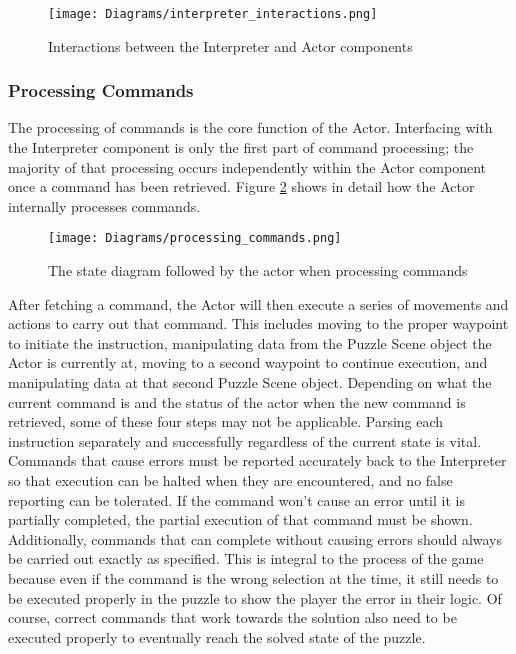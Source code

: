 \begin{figure}[h]
  \caption{Interactions between the Interpreter and Actor components}
  \label{fig:interpreter_interactions}
  \centering
  \texttt{[image: Diagrams/interpreter\_interactions.png]}
\end{figure}

\subsubsection{Processing Commands}
The processing of commands is the core function of the Actor. Interfacing with the Interpreter component is only the first part of command processing; the majority of that processing occurs independently within the Actor component once a command has been retrieved. Figure \ref{fig:processing_commands} shows in detail how the Actor internally processes commands.\\

\begin{figure}[h]
  \caption{The state diagram followed by the actor when processing commands}
  \label{fig:processing_commands}
  \centering
  \texttt{[image: Diagrams/processing\_commands.png]}
\end{figure}

After fetching a command, the Actor will then execute a series of movements and actions to carry out that command. This includes moving to the proper waypoint to initiate the instruction, manipulating data from the Puzzle Scene object the Actor is currently at, moving to a second waypoint to continue execution, and manipulating data at that second Puzzle Scene object. Depending on what the current command is and the status of the actor when the new command is retrieved, some of these four steps may not be applicable. Parsing each instruction separately and successfully regardless of the current state is vital. Commands that cause errors must be reported accurately back to the Interpreter so that execution can be halted when they are encountered, and no false reporting can be tolerated. If the command won't cause an error until it is partially completed, the partial execution of that command must be shown. Additionally, commands that can complete without causing errors should always be carried out exactly as specified. This is integral to the process of the game because even if the command is the wrong selection at the time, it still needs to be executed properly in the puzzle to show the player the error in their logic. Of course, correct commands that work towards the solution also need to be executed properly to eventually reach the solved state of the puzzle.\\

